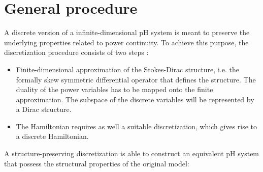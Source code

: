 \section{General procedure}
A discrete version of a infinite-dimensional pH system is meant to preserve the underlying properties related to power continuity. To achieve this purpose, the discretization procedure consists of two steps \cite{kotyczka2018weak}:
\begin{itemize}
	\item Finite-dimensional approximation of the Stokes-Dirac structure, i.e. the formally skew symmetric differential operator that defines the structure. The duality of the power variables has to be mapped onto the finite approximation. The subspace of the discrete variables will be represented by a Dirac structure. 
	\item The Hamiltonian requires as well a suitable discretization, which gives rise to a discrete Hamiltonian. 
\end{itemize} 
A structure-preserving discretization is able to construct an equivalent pH system that possess the structural properties of the original model:
